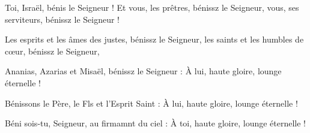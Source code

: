 \item Toi, Israël, bénis le Seigneur !\pscross{} Et vous, les prêtres, bénissz le Seigneur,\psstar{} vous, ses serviteurs, bénissz le Seigneur !
\item Les esprits et les âmes des justes, bénissz le Seigneur,\psstar{} les saints et les humbles de cœur, bénissz le Seigneur,
\item Ananias, Azarias et Misaël, bénissz le Seigneur :\psstar{} À lui, haute gloire, lounge éternelle !
\item Bénissons le Père, le Fls et l'Esprit Saint :\psstar{} À lui, haute gloire, lounge éternelle !
\item Béni sois-tu, Seigneur, au firmamnt du ciel :\psstar{} À toi, haute gloire, lounge éternelle !